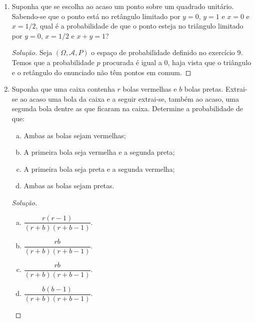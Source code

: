 \documentclass[../Notas.tex]{subfiles}
\begin{document}
\begin{enumerate}
\begin{enumerate}[a)]
    \end{enumerate}
    \begin{proof}[Solução]
        Sejam $A$ e $C$ os eventos ``acertar a questão'' e ``chutar a resposta'', respectivamente.
        Assim, temos
        \begin{enumerate}[a)]
            \item $P(A) = P(A|C)P(C) + P(A|C^c)P(C^c) = (1/5)(3/10) + 7/10 = 19/25$.
            \item $P(C^c|A) = P(A|C^c)P(C^c)/P(A) = (7/10)(25/19) = 35/38$.
        \end{enumerate}
    \end{proof}
    \item Suponha que se escolha ao acaso um ponto sobre um quadrado unitário. Sabendo-se que o ponto está no retângulo limitado por $y = 0$, $y = 1$ e $x = 0$ e $x = 1/2$, qual é a probabilidade de que o ponto esteja no triângulo limitado por $y = 0$, $x = 1/2$ e $x + y = 1$?
    \begin{proof}[Solução]
        Seja $(\Omega, \mathcal{A}, P)$ o espaço de probabilidade definido no exercício 9. Temos que a
        probabilidade $p$ procurada é igual a $0$, haja vista que o triângulo e o retângulo do enunciado
        não têm pontos em comum.
    \end{proof}
    \item Suponha que uma caixa contenha $r$ bolas vermelhas e $b$ bolas pretas. Extrai-se ao acaso uma bola da caixa e a seguir extrai-se, também ao acaso, uma segunda bola dentre as que ficaram na caixa. Determine a probabilidade de que:
    \begin{enumerate}[a)]
    \item Ambas as bolas sejam vermelhas;
    \item A primeira bola seja vermelha e a segunda preta;
    \item A primeira bola seja preta e a segunda vermelha;
    \item Ambas as bolas sejam pretas.
    \end{enumerate}
    \begin{proof}[Solução]
        \begin{enumerate}[a)]
            \item $\dfrac{r(r-1)}{(r+b)(r+b-1)}$.
            \item $\dfrac{rb}{(r+b)(r+b-1)}$.
            \item $\dfrac{rb}{(r+b)(r+b-1)}$.
            \item $\dfrac{b(b-1)}{(r+b)(r+b-1)}$.

\end{enumerate}
\end{proof}
\end{enumerate}
\end{document}
